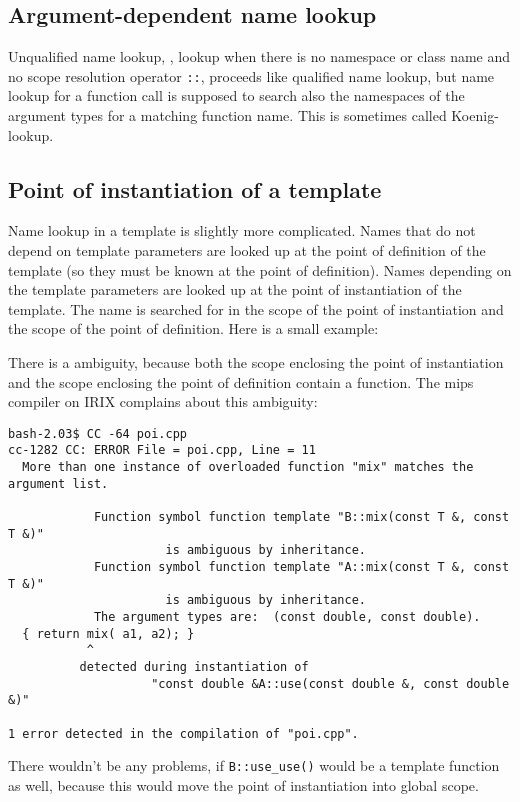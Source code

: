 \subsection{Argument-dependent name lookup}
%
Unqualified name lookup, \ie, lookup when there is no namespace or class
name and no scope resolution%
 operator \verb+::+, proceeds like qualified 
name lookup, but name lookup for a function call is supposed to search also 
the namespaces of the argument types for a matching function name. 
This is sometimes called Koenig-lookup.

\subsection{Point of instantiation of a template}
Name lookup in a template is slightly more complicated.
Names that do not depend on template parameters are looked up at the point
of definition of the template%
(so they must be known at the point of definition). 
Names depending on the template parameters are looked up at
the point of instantiation%
 of the template. 
The name is searched for in the
scope of the point of instantiation and the scope of the
point of definition. Here is a small example:


There is a ambiguity, because both the scope enclosing the point of 
instantiation and the scope enclosing the point of definition contain
a  function. The mips compiler on {\sc IRIX} 
complains about this ambiguity: 

{\small
\begin{verbatim}
bash-2.03$ CC -64 poi.cpp 
cc-1282 CC: ERROR File = poi.cpp, Line = 11
  More than one instance of overloaded function "mix" matches the argument list.

            Function symbol function template "B::mix(const T &, const T &)"
                      is ambiguous by inheritance.
            Function symbol function template "A::mix(const T &, const T &)"
                      is ambiguous by inheritance.
            The argument types are:  (const double, const double).
  { return mix( a1, a2); }
           ^
          detected during instantiation of
                    "const double &A::use(const double &, const double &)" 

1 error detected in the compilation of "poi.cpp".
\end{verbatim}
}
There wouldn't be any problems, if \verb+B::use_use()+ would be a template
function as well, because this would move the point of instantiation
into global scope.

